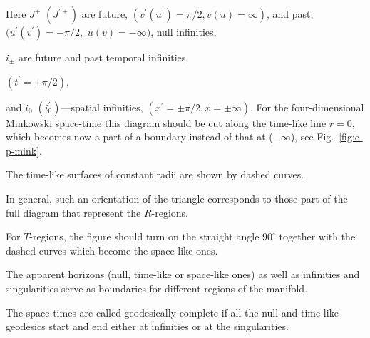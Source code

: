 Here $J^{\pm}$ $(J^{\prime \pm})$ are future, $(v^{\prime} (u^{\prime}) = {\pi}/{2}, v (u) = \infty)$, and past, $({u^{\prime} (v^{\prime}) = - {\pi}/{2},} $ $ u (v) = - \infty)$, null infinities, 

$i_{\pm}$ are future and past temporal infinities, 

${(t^{\prime} = \pm {\pi}/{2})}$, 

and $i_0$ $ (i^{\prime}_0)$---spatial infinities, $(x^{\prime} = \pm {\pi}/{2}, x = \pm \infty)$. For the four-dimensional Minkowski space-time this diagram should be cut along the time-like line $r = 0$, which becomes now a part of a boundary instead of that at ($-\infty$), see Fig.~\ref{fig:c-p-mink}.

The time-like surfaces of constant radii are shown by dashed curves. 

In general, such an orientation of the triangle corresponds to those part of the full diagram that represent the $R$-regions. 

For $T$-regions, the figure should turn on the straight angle $90^{\circ}$ together with the dashed curves which become the space-like ones.  

The apparent horizons (null, time-like or space-like ones) as well as infinities and singularities serve as boundaries for different regions of the manifold. 

The space-times are called geodesically complete if all the null and time-like geodesics start and end either at infinities or at the singularities.





